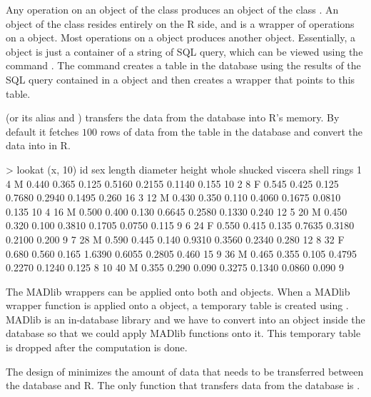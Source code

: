Any operation on an object of the class 
produces an object of the class . An object of the
class  resides entirely on the R side, and is a
wrapper of operations on a  object. Most
operations on a  object produces another
 object. Essentially, a  object is
just a container of a string of SQL query, which can be viewed using
the command
.  The command  creates a
table
in the database using the results of the SQL query contained in a
 object and then creates a 
wrapper that points to this table.

 (or its alias  and )
transfers the data
from
the database into R's memory. By default it fetches $100$ rows of data
from the table in the database and convert the data into
 in R.

\begin{example}
> lookat (x, 10)
   id sex length diameter height  whole shucked viscera shell rings
1   4   M  0.440    0.365  0.125 0.5160  0.2155  0.1140 0.155    10
2   8   F  0.545    0.425  0.125 0.7680  0.2940  0.1495 0.260    16
3  12   M  0.430    0.350  0.110 0.4060  0.1675  0.0810 0.135    10
4  16   M  0.500    0.400  0.130 0.6645  0.2580  0.1330 0.240    12
5  20   M  0.450    0.320  0.100 0.3810  0.1705  0.0750 0.115     9
6  24   F  0.550    0.415  0.135 0.7635  0.3180  0.2100 0.200     9
7  28   M  0.590    0.445  0.140 0.9310  0.3560  0.2340 0.280    12
8  32   F  0.680    0.560  0.165 1.6390  0.6055  0.2805 0.460    15
9  36   M  0.465    0.355  0.105 0.4795  0.2270  0.1240 0.125     8
10 40   M  0.355    0.290  0.090 0.3275  0.1340  0.0860 0.090     9
\end{example}

The MADlib wrappers can be applied onto both 
and  objects. When a MADlib wrapper function is
applied onto a  object, a temporary table is created
using . MADlib is an in-database
library and we have to convert  into an object
inside the database so that we could apply MADlib functions onto
it. This temporary table is dropped after the computation is done.

The design of  minimizes the amount of data that needs
to be transferred between the database and R. The only function that
transfers data from the database is .

